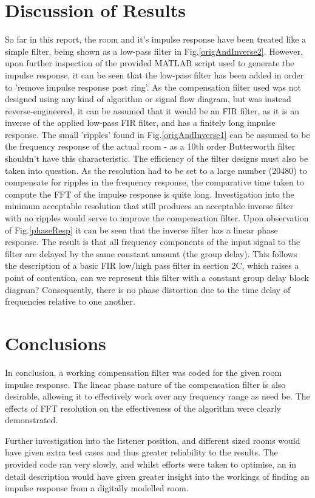 \documentclass[conference]{IEEEtran}
\begin{document}
\section{Discussion of Results}
    So far in this report, the room and it's impulse response have been treated like a simple filter, being shown as a low-pass filter in Fig.\ref{origAndInverse2}.
    However, upon further inspection of the provided MATLAB script used to generate the impulse response, it can be seen that the low-pass filter has been added in order to 'remove impulse response post ring'.
    As the compensation filter used was not designed using any kind of algorithm or signal flow diagram, but was instead reverse-engineered, it can be assumed that it would be an FIR filter, as it is an inverse of the applied low-pass FIR filter, and has a finitely long impulse response.
    The small 'ripples' found in Fig.\ref{origAndInverse1} can be assumed to be the frequency response of the actual room - as a 10th order Butterworth filter shouldn't have this characteristic.
    The efficiency of the filter designs must also be taken into question.
    As the resolution had to be set to a large number (20480) to compensate for ripples in the frequency response, the comparative time taken to compute the FFT of the impulse response is quite long.
    Investigation into the minimum acceptable resolution that still produces an acceptable inverse filter with no ripples would serve to improve the compensation filter.
    Upon observation of Fig.\ref{phaseResp} it can be seen that the inverse filter has a linear phase response.
    The result is that all frequency components of the input signal to the filter are delayed by the same constant amount (the group delay).
    This follows the description of a basic FIR low/high pass filter in section 2C, which raises a point of contention, can we represent this filter with a constant group delay block diagram?
    Consequently, there is no phase distortion due to the time delay of frequencies relative to one another.

\section{Conclusions}
    In conclusion, a working compensation filter was coded for the given room impulse response.
    The linear phase nature of the compensation filter is also desirable, allowing it to effectively work over any frequency range as need be.
    The effects of FFT resolution on the effectiveness of the algorithm were clearly demonstrated.

    Further investigation into the listener position, and different sized rooms would have given extra test cases and thus greater reliability to the results.
    The provided code ran very slowly, and whilst efforts were taken to optimise, an in detail description would have given greater insight into the workings of finding an impulse response from a digitally modelled room.



\end{document}
